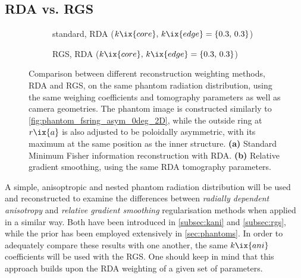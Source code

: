         \subsection{RDA vs. RGS}\label{apx:rdavsrgs}%
%
            \begin{figure}[t]%
                \centering%
                \begin{subfigure}{\textwidth}%
                    \centering%
                    \caption{standard, RDA ($k\ix{core},\,k\ix{edge}=\left\{0.3,\,0.3\right\}$)}%
                \end{subfigure}%
                \newline%
                \begin{subfigure}{\textwidth}%
                    \centering%
                    \caption{RGS, RDA ($k\ix{core},\,k\ix{edge}=\left\{0.3,\,0.3\right\}$)}%
                \end{subfigure}%
                \caption{Comparison between different reconstruction weighting methods, RDA and RGS, on the same phantom radiation distribution, using the same weighing coefficients and tomography parameters as well as camera geometries. The phantom image is constructed similarly to \cref{fig:phantom_fsring_asym_0deg_2D}, while the outside ring at $r\ix{a}$ is also adjusted to be poloidally asymmetric, with its maximum at the same position as the inner structure. \textbf{(a)} Standard Minimum Fisher information reconstruction with RDA. \textbf{(b)} Relative gradient smoothing, using the same RDA tomography parameters.}\label{fig:phantom_fsring_asym_comparison_RGS}%
            \end{figure}%
%
            A simple, anisoptropic and nested phantom radiation distribution will be used and reconstructed to examine the differences between \textit{radially dependent anisotropy} and \textit{relative gradient smoothing} regularisation methods when applied in a similar way. Both have been introduced in \cref{subsec:kani} and \cref{subsec:rgs}, while the prior has been employed extensively in \cref{sec:phantoms}. In order to adequately compare these results with one another, the same $k\ix{ani}$ coefficients will be used with the RGS. One should keep in mind that this approach builds upon the RDA weighting of a given set of parameters.\\%
